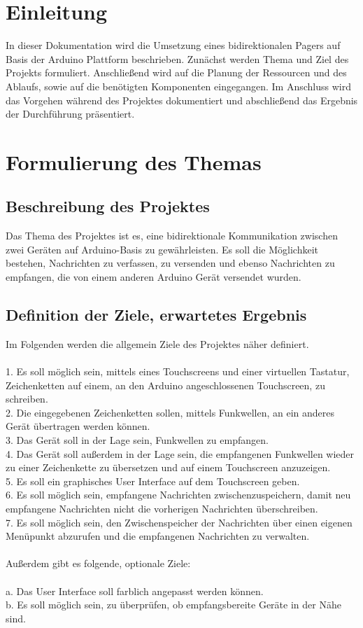 \documentclass[a4paper, 11pt]{scrartcl}
\begin{document}
\newpage
\thispagestyle{empty}
\tableofcontents
\newpage
\clearpage
{}
\section{Einleitung}
In dieser Dokumentation wird die Umsetzung eines bidirektionalen Pagers auf Basis der Arduino Plattform beschrieben. Zunächst werden Thema und Ziel des Projekts formuliert.
Anschließend wird auf die Planung der Ressourcen und des Ablaufs, sowie auf die benötigten Komponenten eingegangen. Im Anschluss wird das Vorgehen während des Projektes dokumentiert
und abschließend das Ergebnis der Durchführung präsentiert.

\section{Formulierung des Themas}
\subsection{Beschreibung des Projektes}
Das Thema des Projektes ist es, eine bidirektionale Kommunikation zwischen zwei Geräten auf Arduino-Basis zu gewährleisten. Es soll die Möglichkeit bestehen,
Nachrichten zu verfassen, zu versenden und ebenso Nachrichten zu empfangen, die von einem anderen Arduino Gerät versendet wurden.

\subsection{Definition der Ziele, erwartetes Ergebnis}
Im Folgenden werden die allgemein Ziele des Projektes näher definiert.
\\
\\
1. Es soll möglich sein, mittels eines Touchscreens und einer virtuellen Tastatur, Zeichenketten auf einem, an den Arduino angeschlossenen Touchscreen, zu schreiben.
\\
2. Die eingegebenen Zeichenketten sollen, mittels Funkwellen, an ein anderes Gerät übertragen werden können.
\\
3. Das Gerät soll in der Lage sein, Funkwellen zu empfangen.
\\
4. Das Gerät soll außerdem in der Lage sein, die empfangenen Funkwellen wieder zu einer Zeichenkette zu übersetzen und auf einem Touchscreen anzuzeigen.
\\
5. Es soll ein graphisches User Interface auf dem Touchscreen geben.
\\
6. Es soll möglich sein, empfangene Nachrichten zwischenzuspeichern, damit neu empfangene Nachrichten nicht die vorherigen Nachrichten überschreiben.
\\
7. Es soll möglich sein, den Zwischenspeicher der Nachrichten über einen eigenen Menüpunkt abzurufen und die empfangenen Nachrichten zu verwalten.
\\
\\
Außerdem gibt es folgende, optionale Ziele:
\\
\\
a. Das User Interface soll farblich angepasst werden können.
\\
b. Es soll möglich sein, zu überprüfen, ob empfangsbereite Geräte in der Nähe sind.
\end{document}
